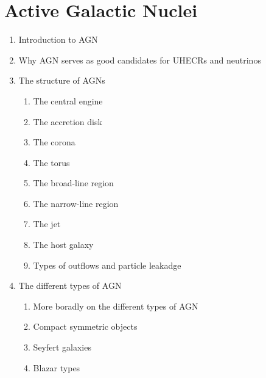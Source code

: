 \section{Active Galactic Nuclei}
\begin{enumerate}
    \item Introduction to AGN
    \item Why AGN serves as good candidates for UHECRs and neutrinos
    \item The structure of AGNs 
    \begin{enumerate}
        \item The central engine
        \item The accretion disk
        \item The corona
        \item The torus
        \item The broad-line region
        \item The narrow-line region
        \item The jet
        \item The host galaxy
        \item Types of outflows and particle leakadge
    \end{enumerate}
    \item The different types of AGN
    \begin{enumerate}
        \item More boradly on the different types of AGN
        \item Compact symmetric objects
        \item Seyfert galaxies
        \item Blazar types
    \end{enumerate}
\end{enumerate}